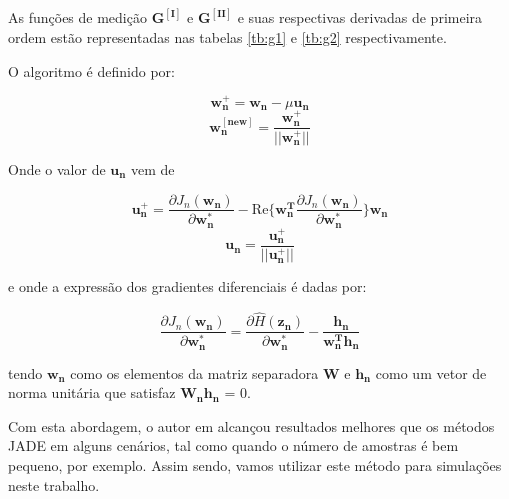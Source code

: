     As funções de medição $\mathbf{G^{[I]}}$ e $\mathbf{G^{[II]}}$ e suas respectivas derivadas de primeira ordem estão representadas nas tabelas \ref{tb:g1} e \ref{tb:g2} respectivamente. 

    O algoritmo é definido por:

    \begin{equation}
        \mathbf{w_n^+} = \mathbf{w_n} - \mu\mathbf{u_n}
    \end{equation}
    \begin{equation}
        \mathbf{w_n^{[new]}} = \frac{\mathbf{w_n^+}}{||\mathbf{w_n^+}||}
    \end{equation}
    
    Onde o valor de $\mathbf{u_n}$ vem de
    
    \begin{equation}
        \mathbf{u_n^+} = \frac{\partial J_n(\mathbf{w_n})}{\partial \mathbf{w_n^*}} - \text{Re}\{\mathbf{w_n^T}\frac{\partial J_n(\mathbf{w_n})}{\partial \mathbf{w_n^*}}\}\mathbf{w_n}
    \end{equation}
    \begin{equation}
        \mathbf{u_n} = \frac{\mathbf{u_n^+}}{||\mathbf{u_n^+}||}
    \end{equation}
    
    e onde a expressão dos gradientes diferenciais é dadas por:
    
    \begin{equation}
        \frac{\partial J_n(\mathbf{w_n})}{\partial \mathbf{w_n^*}} = \frac{\partial \hat{H}(\mathbf{z_n})}{\partial \mathbf{w_n^*}} - \frac{\mathbf{h_n}}{\mathbf{w_n^Th_n}}
    \end{equation}
    
    tendo  $\mathbf{w_n}$ como os elementos da matriz separadora $\mathbf{W}$  e $\mathbf{h_n}$ como um vetor de norma unitária que satisfaz $\mathbf{W_nh_n}$ = 0.
    
    Com esta abordagem, o autor em \cite{fasticaebm} alcançou resultados melhores que os métodos JADE \cite{JADE} em alguns cenários, tal como quando o número de amostras é bem pequeno, por exemplo. Assim sendo, vamos utilizar este método para simulações neste trabalho.
    
